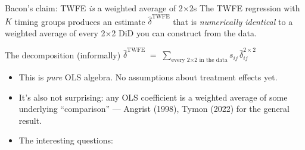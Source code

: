 \documentclass[aspectratio=169,11pt]{beamer}
\begin{document}

\begin{frame}{Bacon's claim: TWFE \textit{is} a weighted average of 2$\times$2s}
\vspace{0.4em}
The TWFE regression with $K$ timing groups produces an estimate $\widehat{\delta}^{\text{TWFE}}$ that is \textit{numerically identical} to a weighted average of every 2$\times$2 DiD you can construct from the data.
\vspace{0.6em}

\begin{block}{The decomposition (informally)}
\centering
$\widehat{\delta}^{\text{TWFE}} \;=\; \displaystyle\sum_{\text{every 2}\times\text{2 in the data}} s_{ij}\, \widehat{\delta}^{2\times 2}_{ij}$
\end{block}

\vspace{0.6em}
\begin{itemize}\small
  \item This is \textit{pure} OLS algebra. \;No assumptions about treatment effects yet.
  \item It's also not surprising: any OLS coefficient is a weighted average of some underlying ``comparison'' --- Angrist (1998), Tymon (2022) for the general result.
  \item The interesting questions: \;
\end{itemize}
\end{frame}
\end{document}
